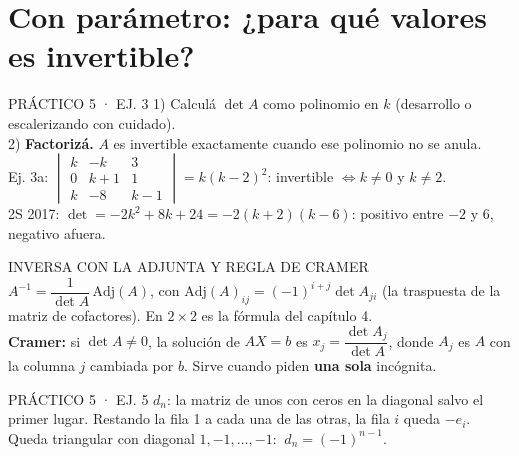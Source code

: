 \section{Con parámetro: ¿para qué valores es invertible?}
\begin{metodo}{PRÁCTICO 5 · EJ. 3}
1) Calculá $\det A$ como polinomio en $k$ (desarrollo o escalerizando con cuidado).\\
2) \textbf{Factorizá.} $A$ es invertible exactamente cuando ese polinomio no se anula.\\[2pt]
Ej. 3a: $\begin{vmatrix}k&-k&3\\0&k+1&1\\k&-8&k-1\end{vmatrix}=k(k-2)^2$: invertible $\iff k\neq0$ y $k\neq2$.\\
2S 2017: $\det=-2k^2+8k+24=-2(k+2)(k-6)$: positivo entre $-2$ y $6$, negativo afuera.
\end{metodo}
\begin{sello}{INVERSA CON LA ADJUNTA Y REGLA DE CRAMER}
$A^{-1}=\dfrac1{\det A}\,\mathrm{Adj}(A)$, con $\mathrm{Adj}(A)_{ij}=(-1)^{i+j}\det A_{ji}$ (la traspuesta de la matriz de cofactores). En $2\times2$ es la fórmula del capítulo 4.\\[3pt]
\textbf{Cramer:} si $\det A\neq0$, la solución de $AX=b$ es $x_j=\dfrac{\det A_j}{\det A}$, donde $A_j$ es $A$ con la columna $j$ cambiada por $b$. Sirve cuando piden \textbf{una sola} incógnita.
\end{sello}
\begin{memo}{PRÁCTICO 5 · EJ. 5}
$d_n$: la matriz de unos con ceros en la diagonal salvo el primer lugar. Restando la fila 1 a cada una de las otras, la fila $i$ queda $-e_i$. Queda triangular con diagonal $1,-1,\dots,-1$: $\ d_n=(-1)^{n-1}$.
\end{memo}
